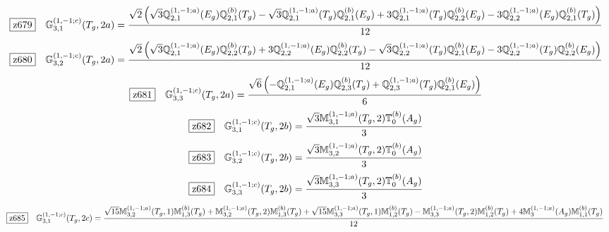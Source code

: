 \documentclass[fleqn,10pt,landscape]{jsarticle}
\begin{document}
\begin{dmath*}
\hspace*{3mm}\fbox{z679}\quad \mathbb{G}_{3,1}^{(1,-1;c)}(T_{g},2a)=\frac{\sqrt{2} \left(\sqrt{3} \mathbb{Q}_{2,1}^{(1,-1;a)}(E_{g}) \mathbb{Q}_{2,1}^{(b)}(T_{g}) - \sqrt{3} \mathbb{Q}_{2,1}^{(1,-1;a)}(T_{g}) \mathbb{Q}_{2,1}^{(b)}(E_{g}) + 3 \mathbb{Q}_{2,1}^{(1,-1;a)}(T_{g}) \mathbb{Q}_{2,2}^{(b)}(E_{g}) - 3 \mathbb{Q}_{2,2}^{(1,-1;a)}(E_{g}) \mathbb{Q}_{2,1}^{(b)}(T_{g})\right)}{12}
\end{dmath*}
\begin{dmath*}
\hspace*{3mm}\fbox{z680}\quad \mathbb{G}_{3,2}^{(1,-1;c)}(T_{g},2a)=\frac{\sqrt{2} \left(\sqrt{3} \mathbb{Q}_{2,1}^{(1,-1;a)}(E_{g}) \mathbb{Q}_{2,2}^{(b)}(T_{g}) + 3 \mathbb{Q}_{2,2}^{(1,-1;a)}(E_{g}) \mathbb{Q}_{2,2}^{(b)}(T_{g}) - \sqrt{3} \mathbb{Q}_{2,2}^{(1,-1;a)}(T_{g}) \mathbb{Q}_{2,1}^{(b)}(E_{g}) - 3 \mathbb{Q}_{2,2}^{(1,-1;a)}(T_{g}) \mathbb{Q}_{2,2}^{(b)}(E_{g})\right)}{12}
\end{dmath*}
\begin{dmath*}
\hspace*{3mm}\fbox{z681}\quad \mathbb{G}_{3,3}^{(1,-1;c)}(T_{g},2a)=\frac{\sqrt{6} \left(- \mathbb{Q}_{2,1}^{(1,-1;a)}(E_{g}) \mathbb{Q}_{2,3}^{(b)}(T_{g}) + \mathbb{Q}_{2,3}^{(1,-1;a)}(T_{g}) \mathbb{Q}_{2,1}^{(b)}(E_{g})\right)}{6}
\end{dmath*}
\begin{dmath*}
\hspace*{3mm}\fbox{z682}\quad \mathbb{G}_{3,1}^{(1,-1;c)}(T_{g},2b)=\frac{\sqrt{3} \mathbb{M}_{3,1}^{(1,-1;a)}(T_{g},2) \mathbb{T}_{0}^{(b)}(A_{g})}{3}
\end{dmath*}
\begin{dmath*}
\hspace*{3mm}\fbox{z683}\quad \mathbb{G}_{3,2}^{(1,-1;c)}(T_{g},2b)=\frac{\sqrt{3} \mathbb{M}_{3,2}^{(1,-1;a)}(T_{g},2) \mathbb{T}_{0}^{(b)}(A_{g})}{3}
\end{dmath*}
\begin{dmath*}
\hspace*{3mm}\fbox{z684}\quad \mathbb{G}_{3,3}^{(1,-1;c)}(T_{g},2b)=\frac{\sqrt{3} \mathbb{M}_{3,3}^{(1,-1;a)}(T_{g},2) \mathbb{T}_{0}^{(b)}(A_{g})}{3}
\end{dmath*}
\begin{dmath*}
\hspace*{3mm}\fbox{z685}\quad \mathbb{G}_{3,1}^{(1,-1;c)}(T_{g},2c)=\frac{\sqrt{15} \mathbb{M}_{3,2}^{(1,-1;a)}(T_{g},1) \mathbb{M}_{1,3}^{(b)}(T_{g}) + \mathbb{M}_{3,2}^{(1,-1;a)}(T_{g},2) \mathbb{M}_{1,3}^{(b)}(T_{g}) + \sqrt{15} \mathbb{M}_{3,3}^{(1,-1;a)}(T_{g},1) \mathbb{M}_{1,2}^{(b)}(T_{g}) - \mathbb{M}_{3,3}^{(1,-1;a)}(T_{g},2) \mathbb{M}_{1,2}^{(b)}(T_{g}) + 4 \mathbb{M}_{3}^{(1,-1;a)}(A_{g}) \mathbb{M}_{1,1}^{(b)}(T_{g})}{12}
\end{dmath*}
\end{document}
